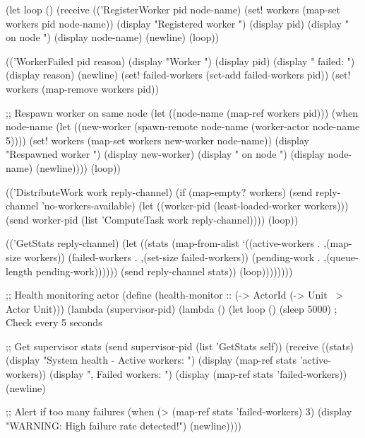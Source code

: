 \begin{example}
\begin{lambdustcode}
        (let loop ()
          (receive
            (('RegisterWorker pid node-name)
             (set! workers (map-set workers pid node-name))
             (display "Registered worker ") (display pid) 
             (display " on node ") (display node-name) (newline)
             (loop))
            
            (('WorkerFailed pid reason)
             (display "Worker ") (display pid) (display " failed: ") (display reason) (newline)
             (set! failed-workers (set-add failed-workers pid))
             (set! workers (map-remove workers pid))
             
             ;; Respawn worker on same node
             (let ((node-name (map-ref workers pid)))
               (when node-name
                 (let ((new-worker (spawn-remote node-name (worker-actor node-name 5))))
                   (set! workers (map-set workers new-worker node-name))
                   (display "Respawned worker ") (display new-worker) 
                   (display " on node ") (display node-name) (newline))))
             (loop))
            
            (('DistributeWork work reply-channel)
             (if (map-empty? workers)
                 (send reply-channel 'no-workers-available)
                 (let ((worker-pid (least-loaded-worker workers)))
                   (send worker-pid (list 'ComputeTask work reply-channel))))
             (loop))
            
            (('GetStats reply-channel)
             (let ((stats (map-from-alist
                          `((active-workers . ,(map-size workers))
                            (failed-workers . ,(set-size failed-workers))
                            (pending-work . ,(queue-length pending-work))))))
               (send reply-channel stats))
             (loop))))))))

;; Health monitoring actor
(define (health-monitor :: (-> ActorId (-> Unit ~> {Actor} Unit)))
  (lambda (supervisor-pid)
    (lambda ()
      (let loop ()
        (sleep 5000)  ; Check every 5 seconds
        
        ;; Get supervisor stats
        (send supervisor-pid (list 'GetStats self))
        (receive
          ((stats)
           (display "System health - Active workers: ") 
           (display (map-ref stats 'active-workers))
           (display ", Failed workers: ")
           (display (map-ref stats 'failed-workers)) (newline)
           
           ;; Alert if too many failures
           (when (> (map-ref stats 'failed-workers) 3)
             (display "WARNING: High failure rate detected!") (newline))))
        

\end{lambdustcode}
\end{example}
